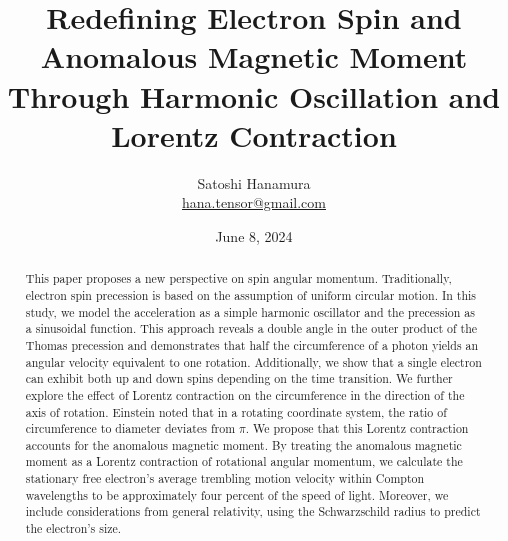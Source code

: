 \documentclass[10.5pt]{article}
\title{Redefining Electron Spin and Anomalous Magnetic Moment\\ Through Harmonic Oscillation and Lorentz Contraction}
\author{Satoshi Hanamura\\ \small\href{mailto:hana.tensor@gmail.com}{hana.tensor@gmail.com}}
\date{June 8, 2024}
\numberwithin{equation}{section}
\begin{document}
\maketitle
\begin{abstract}


    This paper proposes a new perspective on spin angular momentum. Traditionally, electron spin precession is based on the assumption of uniform circular motion. In this study, we model the acceleration as a simple harmonic oscillator and the precession as a sinusoidal function. This approach reveals a double angle in the outer product of the Thomas precession and demonstrates that half the circumference of a photon yields an angular velocity equivalent to one rotation. Additionally, we show that a single electron can exhibit both up and down spins depending on the time transition. We further explore the effect of Lorentz contraction on the circumference in the direction of the axis of rotation. Einstein noted that in a rotating coordinate system, the ratio of circumference to diameter deviates from $\pi$. We propose that this Lorentz contraction accounts for the anomalous magnetic moment. By treating the anomalous magnetic moment as a Lorentz contraction of rotational angular momentum, we calculate the stationary free electron's average trembling motion velocity within Compton wavelengths to be approximately four percent of the speed of light. Moreover, we include considerations from general relativity, using the Schwarzschild radius to predict the electron's size.

    \end{abstract}
\end{document}
